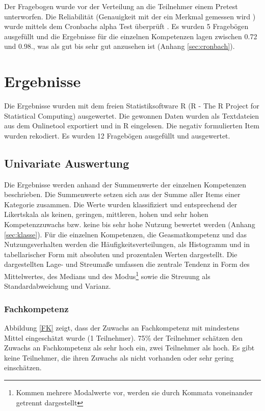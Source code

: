 \documentclass[12pt, bibliography=totoc]{scrartcl}
\begin{document}
Der Fragebogen wurde vor der Verteilung an die Teilnehmer einem Pretest
unterworfen. Die Reliabilität (Genauigkeit mit der ein Merkmal gemessen
wird \parencite[5]{rammstedt2004bestimmung}) wurde mittels dem Cronbachs
alpha Test überprüft \parencite{Wassa}. Es wurden 5 Fragebögen
ausgefüllt und die Ergebnisse für die einzelnen Kompetenzen lagen
zwischen 0.72 und 0.98., was als gut bis sehr gut anzusehen ist (Anhang
\ref{sec:cronbach}).

\section{Ergebnisse}\label{ergebnisse}

Die Ergebnisse wurden mit dem freien Statistiksoftware R (R - The R
Project for Statistical Computing) ausgewertet. Die gewonnen Daten
wurden als Textdateien aus dem Onlinetool exportiert und in R
eingelesen. Die negativ formulierten Item wurden rekodiert. Es wurden 12
Fragebögen ausgefüllt und ausgewertet.

\subsection{Univariate Auswertung}\label{univariate-auswertung}

Die Ergebnisse werden anhand der Summenwerte der einzelnen Kompetenzen
beschrieben. Die Summenwerte setzen sich aus der Summe aller Items einer
Kategorie zusammen. Die Werte wurden klassifiziert und entsprechend der
Likertskala als keinen, geringen, mittleren, hohen und sehr hohen
Kompetenzzuwachs bzw. keine bis sehr hohe Nutzung bewertet werden
(Anhang \ref{sec:klasse}). Für die einzelnen Kompetenzen, die
Geasmatkompetenz und das Nutzungsverhalten werden die
Häufigkeitsverteilungen, als Histogramm und in tabellarischer Form mit
absoluten und prozentalen Werten dargestellt. Die dargestellten Lage-
und Streumaße umfassen die zentrale Tendenz in Form des Mittelwertes,
des Medians und des
Modus\footnote{Kommen mehrere Modalwerte vor, werden sie durch Kommata voneinander getrennt dargestellt}
sowie die Streuung als Standardabweichung und Varianz.

\subsubsection{Fachkompetenz}\label{fachkompetenz}

Abbildung \ref{FK} zeigt, dass der Zuwachs an Fachkompetenz mit
mindestens Mittel eingeschätzt wurde (1 Teilnehmer). 75\% der Teilnehmer
schätzen den Zuwachs an Fachkompetenz als sehr hoch ein, zwei Teilnehmer
als hoch. Es gibt keine Teilnehmer, die ihren Zuwachs als nicht
vorhanden oder sehr gering einschätzen.
\end{document}
